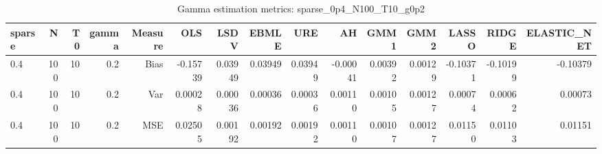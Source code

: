 \begin{table}[!htbp]\centering
\caption{Gamma estimation metrics: sparse_0p4_N100_T10_g0p2}
\label{tab:table1_sparse_0p4_N100_T10_g0p2}
\begin{tabular}{lrrrrrrrrrrrrrr}
\hline
sparse & N & T0 & gamma & Measure & OLS & LSDV & EBMLE & URE & AH & GMM1 & GMM2 & LASSO & RIDGE & ELASTIC_NET \\
\hline
0.4 & 100 & 10 & 0.2 & Bias & -0.15739 & 0.03949 & 0.03949 & 0.03949 & -0.00041 & 0.00392 & 0.00129 & -0.10371 & -0.10199 & -0.10379 \\
0.4 & 100 & 10 & 0.2 & Var & 0.00028 & 0.00036 & 0.00036 & 0.00036 & 0.00110 & 0.00105 & 0.00127 & 0.00074 & 0.00062 & 0.00073 \\
0.4 & 100 & 10 & 0.2 & MSE & 0.02505 & 0.00192 & 0.00192 & 0.00192 & 0.00110 & 0.00107 & 0.00127 & 0.01150 & 0.01103 & 0.01151 \\
\hline
\end{tabular}
\end{table}

